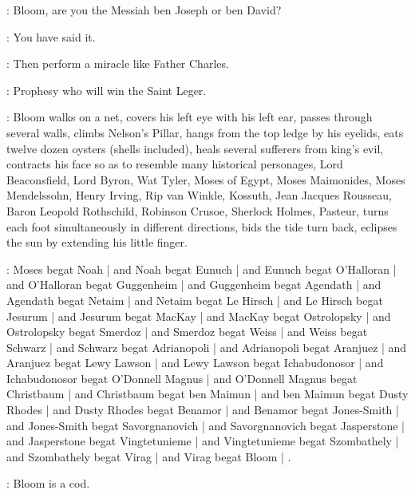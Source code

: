 \Voice:
Bloom,
are you the Messiah ben Joseph or ben David?

\Bloom:
You have said it.

\BrotherBuzz[2]:
Then perform a miracle like Father Charles.

\BantamLyons[2]:
Prophesy who will win the Saint Leger.%

:
Bloom walks on a net,
covers his left eye with his left ear,
passes through several walls,
climbs Nelson's Pillar,
hangs from the top ledge by his eyelids,
eats twelve dozen oysters (shells included),
heals several sufferers from king's evil,
contracts his face so as to resemble many historical personages,
Lord Beaconsfield,
Lord Byron,
Wat Tyler,
Moses of Egypt,
Moses Maimonides,
Moses Mendelssohn,
Henry Irving,
Rip van Winkle,
Kossuth,
Jean Jacques Rousseau,
Baron Leopold Rothschild,
Robinson Crusoe,
Sherlock Holmes,
Pasteur,
turns each foot simultaneously in different directions,
bids the tide turn back,
eclipses the sun by extending his little finger.


\begin{omitted}
\Brini:
Moses begat Noah |
and Noah begat Eunuch |
and Eunuch begat O'Halloran |
and O'Halloran begat Guggenheim |
and Guggenheim begat Agendath |
and Agendath begat Netaim |
and Netaim begat Le Hirsch |
and Le Hirsch begat Jesurum |
and Jesurum begat MacKay |
and MacKay begat Ostrolopsky |
and Ostrolopsky begat Smerdoz |
and Smerdoz begat Weiss |
and Weiss begat Schwarz |
and Schwarz begat Adrianopoli |
and Adrianopoli begat Aranjuez |
and Aranjuez begat Lewy Lawson |
and Lewy Lawson begat Ichabudonosor |
and Ichabudonosor begat O'Donnell Magnus |
and O'Donnell Magnus begat Christbaum |
and Christbaum begat ben Maimun |
and ben Maimun begat Dusty Rhodes |
and Dusty Rhodes begat Benamor |
and Benamor begat Jones-Smith |
and Jones-Smith begat Savorgnanovich |
and Savorgnanovich begat Jasperstone |
and Jasperstone begat Vingtetunieme |
and Vingtetunieme begat Szombathely |
and Szombathely begat Virag |
and Virag begat Bloom |
.

\Deadhand:
Bloom is a cod.
\end{omitted}


